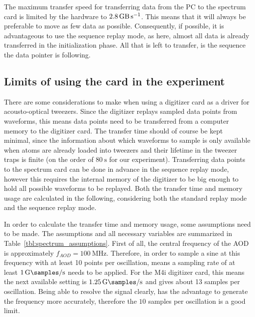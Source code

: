 The maximum transfer speed for transferring data from the PC to the spectrum card is limited by the hardware to $\SI{2.8}{\giga\byte\per\second}$. This means that it will always be preferable to move as few data as possible. Consequently, if possible, it is advantageous to use the sequence replay mode, as here, almost all data is already transferred in the initialization phase. All that is left to transfer, is the sequence the data pointer is following.

\subsection{Limits of using the card in the experiment}

There are some considerations to make when using a digitizer card as a driver for acousto-optical tweezers. Since the digitizer replays sampled data points from waveforms, this means data points need to be transferred from a computer memory to the digitizer card. The transfer time should of course be kept minimal, since the information about which waveforms to sample is only available when atoms are already loaded into tweezers and their lifetime in the tweezer traps is finite (on the order of $\SI{80}{\second}$ for our experiment). Transferring data points to the spectrum card can be done in advance in the sequence replay mode, however this requires the internal memory of the digitizer to be big enough to hold all possible waveforms to be replayed. Both the transfer time and memory usage are calculated in the following, considering both the standard replay mode and the sequence replay mode.

In order to calculate the transfer time and memory usage, some assumptions need to be made. The assumptions and all necessary variables are summarized in Table~\ref{tbl:spectrum_assumptions}. First of all, the central frequency of the AOD is approximately $f_{AOD} = \SI{100}{\mega\hertz}$. Therefore, in order to sample a sine at this frequency with at least 10 points per oscillation, means a sampling rate of at least $\SI{1}{\giga\samples\per\second}$ needs to be applied. For the M4i digitizer card, this means the next available setting is $\SI{1.25}{\giga\samples\per\second}$ and gives about 13 samples per oscillation. Being able to resolve the signal clearly, has the advantage to generate the frequency more accurately, therefore the $10$ samples per oscillation is a good limit.


